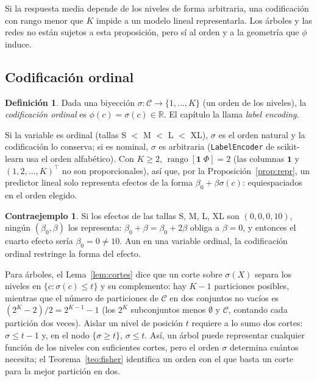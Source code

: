 \documentclass[11pt,a4paper]{article}
\theoremstyle{plain}
\theoremstyle{definition}
\newtheorem{definicion}[teorema]{Definición}
\newtheorem{contraejemplo}[teorema]{Contraejemplo}
\theoremstyle{remark}
\newcommand{\R}{\mathbb{R}}
\newcommand{\rango}{\operatorname{rango}}
\newcommand{\1}{\mathbf{1}}
\begin{document}
Si la respuesta media depende de los niveles de forma arbitraria, una
codificación con rango menor que $K$ impide a un modelo lineal
representarla. Los árboles y las redes no están sujetos a esta
proposición, pero sí al orden y a la geometría que $\phi$ induce.

\subsection{Codificación ordinal}

\begin{definicion}
Dada una biyección $\sigma:\mathcal C\to\{1,\dots,K\}$ (un orden de los
niveles), la \emph{codificación ordinal} es $\phi(c)=\sigma(c)\in\R$. El
capítulo la llama \emph{label encoding}.
\end{definicion}

Si la variable es ordinal (tallas S $<$ M $<$ L $<$ XL), $\sigma$ es el orden
natural y la codificación lo conserva; si es nominal, $\sigma$ es
arbitraria (\texttt{LabelEncoder} de scikit-learn usa el orden
alfabético). Con $K\ge2$, $\rango[\1\;\Phi]=2$ (las columnas $\1$ y
$(1,2,\dots,K)^\top$ no son proporcionales), así que, por la
Proposición~\ref{prop:repr}, un predictor lineal solo representa efectos de
la forma $\beta_0+\beta\sigma(c)$: equiespaciados en el orden elegido.

\begin{contraejemplo}
Si los efectos de las tallas S, M, L, XL son $(0,0,0,10)$, ningún
$(\beta_0,\beta)$ los representa: $\beta_0+\beta=\beta_0+2\beta$ obliga a
$\beta=0$, y entonces el cuarto efecto sería $\beta_0=0\ne10$. Aun en una
variable ordinal, la codificación ordinal restringe la forma del efecto.
\end{contraejemplo}

Para árboles, el Lema~\ref{lem:cortes} dice que un corte sobre
$\sigma(X)$ separa los niveles en $\{c:\sigma(c)\le t\}$ y su
complemento: hay $K-1$ particiones posibles, mientras que el número de
particiones de $\mathcal C$ en dos conjuntos no vacíos es
$(2^K-2)/2=2^{K-1}-1$ (los $2^K$ subconjuntos menos $\emptyset$ y
$\mathcal C$, contando cada partición dos veces). Aislar un nivel de
posición $t$ requiere a lo sumo dos cortes: $\sigma\le t-1$ y, en el nodo
$\{\sigma\ge t\}$, $\sigma\le t$. Así, un árbol puede representar
cualquier función de los niveles con suficientes cortes, pero el orden
$\sigma$ determina cuántos necesita; el Teorema~\ref{teo:fisher} identifica
un orden con el que basta un corte para la mejor partición en dos.
\end{document}
